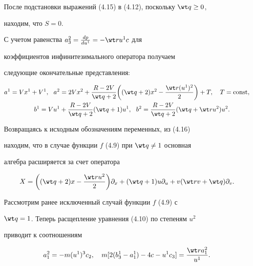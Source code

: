 После подстановки выражений (4.15) в (4.12), поскольку $\wt q\ge0$, 


находим, что $S=0$. 


С учетом равенства $a^2_3=\frac{dp}{du^1}=-\wt r u^1c$ для 


коэффициентов инфинитезимального оператора получаем


следующие окончательные представления:


\begin{equation} 


\begin{split}


a^1=Vx^1+V^1,\ \ a^2&=2Vx^2+\frac{R-2V}{\wt q+2}\bigg((\wt q+2) 


x^2-\frac{\wt r(u^1)^2}{2}\bigg)+T,\quad T=\const,\\ 


% 


b^1=Vu^1&+\frac{R-2V}{\wt q+2}(\wt q+1)u^1,\ \ 


b^2=\frac{R-2V}{\wt q+2}(\wt q+\wt r u^2)u^2.


\end{split}


\end{equation} 


Возвращаясь к исходным обозначениям переменных, из (4.16) 


находим, что в случае функции $f$ (4.9) при $\wt q\ne1$ основная 


алгебра расширяется за счет оператора 


$$ 


X=\bigg((\wt q+2)x-\frac{\wt r u^2}{2} \bigg)\partial_x+ 


(\wt q+1)u\partial_u+v(\wt r v+\wt q)\partial_v. 


$$ 


 


Рассмотрим ранее исключенный случай функции $f$ (4.9) с 


$\wt q=1$. Теперь расщепление уравнения (4.10) по степеням $u^2$ 


приводит к соотношениям 


\begin{equation} 


a^2_1=-m(u^1)^3c_2,\quad m[2(b^1_3-a^1_1)-4c-u^1c_3]= 


\frac{\wt r a^2_1}{u^1}. 


\end{equation} 


